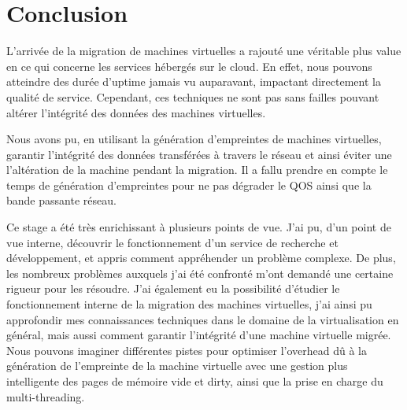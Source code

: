 \newpage
\section*{Conclusion}
L’arrivée de la migration de machines virtuelles a rajouté une véritable plus value en ce qui concerne les services hébergés sur le cloud.
En effet, nous pouvons atteindre des durée d'uptime jamais vu auparavant, impactant directement la qualité de service.
Cependant, ces techniques ne sont pas sans failles pouvant altérer l'intégrité des données des machines virtuelles.

Nous avons pu, en utilisant la génération d'empreintes de machines virtuelles, garantir l'intégrité des données transférées à travers le réseau et ainsi éviter une l'altération de la machine pendant la migration.
Il a fallu prendre en compte le temps de génération d'empreintes pour ne pas dégrader le QOS ainsi que la bande passante réseau.

Ce stage a été très enrichissant à plusieurs points de vue.
J’ai pu, d’un point de vue interne, découvrir le fonctionnement d’un service de recherche et développement, et appris comment appréhender un problème complexe.
De plus, les nombreux problèmes auxquels j'ai été confronté m'ont demandé une certaine rigueur pour les résoudre.
J'ai également eu la possibilité d'étudier le fonctionnement interne de la migration des machines virtuelles, j'ai ainsi pu approfondir mes connaissances techniques dans le domaine de la virtualisation en général, mais aussi comment garantir l'intégrité d'une machine virtuelle migrée.
Nous pouvons imaginer différentes pistes pour optimiser l'overhead dû à la génération de l'empreinte de la machine virtuelle avec une gestion plus intelligente des pages de mémoire vide et dirty, ainsi que la prise en charge du multi-threading.